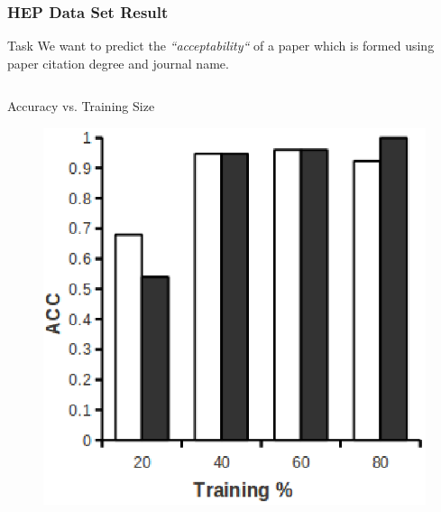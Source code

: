 \documentclass[10pt, blue,subsection=true, compress]{beamer}
\begin{document}
\begin{frame}\frametitle{HEP Data Set Result}

\begin{block}{Task}
We want to predict the \emph{``acceptability``} of a paper which is formed using paper citation degree and journal name.
\end{block}
\begin{columns}[t]

\begin{block}{Accuracy vs. Training Size}
\begin{figure}[htbp]
\centering
\includegraphics[scale=0.25]{img/hep-acc.eps}
\end{figure}
\end{block}



\end{columns}
\end{frame}
\end{document}
